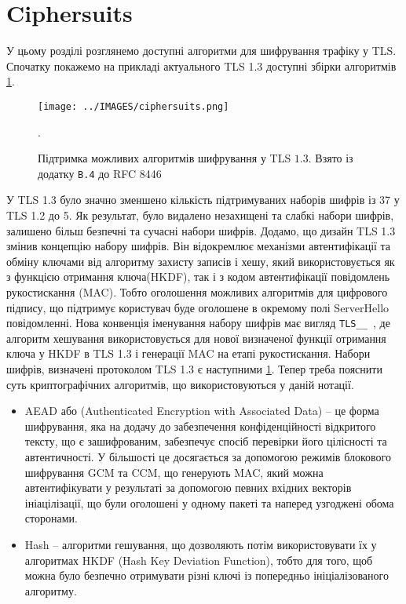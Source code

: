 \section{Ciphersuits}
У цьому розділі розглянемо доступні алгоритми для шифрування трафіку у TLS. Спочатку покажемо на прикладі актуального TLS 1.3 доступні збірки алгоритмів \ref{tls_1_3_ciphersuits}.
\begin{figure}[ht]
        \centering
        \texttt{[image: ../IMAGES/ciphersuits.png]}
        \caption{Підтримка можливих алгоритмів шифрування у TLS $1.3$. Взято із додатку \texttt{B.4} до RFC 8446}.
        \label{tls_1_3_ciphersuits}
\end{figure}
У TLS 1.3 було значно зменшено кількість підтримуваних наборів шифрів із 37 у TLS 1.2 до 5. Як результат, було видалено незахищені та слабкі набори шифрів, залишено більш безпечні та сучасні набори шифрів. Додамо, що дизайн TLS 1.3 змінив концепцію набору шифрів. Він відокремлює механізми автентифікації та обміну ключами від алгоритму захисту записів і хешу, який використовується як з функцією отримання ключа(HKDF), так і з кодом автентифікації повідомлень рукостискання (MAC). Тобто оголошення можливих алгоритмів для цифрового підпису, що підтримує користувач буде оголошене в окремому полі ServerHello повідомленні.
Нова конвенція іменування набору шифрів має вигляд \texttt{TLS\_\_ }, де алгоритм хешування використовується для нової визначеної функції отримання ключа у HKDF в TLS 1.3 і генерації MAC на етапі рукостискання. Набори шифрів, визначені протоколом TLS 1.3 є наступними \ref{tls_1_3_ciphersuits}.
Тепер треба пояснити суть криптографічних алгоритмів, що використовуються у даній нотації.
\begin{itemize}
    \item AEAD або (Authenticated Encryption with Associated Data) --  це форма шифрування, яка на додачу до забезпечення конфіденційності відкритого тексту, що є зашифрованим, забезпечує спосіб перевірки його цілісності та автентичності. У більшості це досягається за допомогою режимів блокового шифрування GCM та CCM, що генерують MAC, який можна автентифікувати у результаті за допомогою певних вхідних векторів ініацілізації, що були оголошені у одному пакеті та наперед узгоджені обома сторонами.
    \item Hash -- алгоритми гешування, що дозволяють потім використовувати їх у алгоритмах HKDF (Hash Key Deviation Function), тобто для того, щоб можна було безпечно отримувати різні ключі із попередньо ініціалізованого алгоритму.
\end{itemize}
